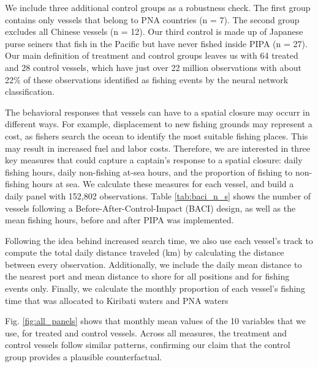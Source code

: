 \documentclass[9p,twocolumn,twoside,lineno]{pnas-new}
\begin{document}
We include three additional control groups as a
robustness check. The first group contains only vessels that belong to PNA countries (n
= 7). The second group excludes all Chinese vessels (n = 12). Our third control
is made up of Japanese purse seiners that fish in the Pacific but have
never fished inside PIPA (n = 27). Our main definition of treatment and control
groups leaves us with 64 treated and 28 control vessels, which have just over 22 million
observations with about 22\% of these observations identified as fishing events by the neural network classification.

The behavioral responses that vessels can have to a spatial closure may occurr in different ways.
For example, displacement to new fishing grounds may represent a cost, as fishers search the ocean
to identify the most suitable fishing places. This may result in increased fuel and labor costs. Therefore,
we are interested in three key measures that could capture a captain's response to a spatial closure:
daily fishing hours, daily non-fishing at-sea hours, and the proportion of fishing to non-fishing hours at sea.
We calculate these measures for each vessel, and build a daily panel
with 152,802 observations. Table \ref{tab:baci_n_s} shows the number
of vessels following a Before-After-Control-Impact (BACI) design, as well as the mean fishing hours, before
and after PIPA was implemented.

Following the idea behind increased search time, we also use each vessel's track to compute
the total daily distance traveled (km) by calculating the distance between every observation.
Additionally, we include the daily mean distance to the nearest port and mean distance to shore
for all positions and for fishing events only. Finally, we calculate the monthly proportion of each vessel's
fishing time that was allocated to Kiribati waters and PNA waters

Fig. \ref{fig:all_panels} shows that monthly mean values of the 10 variables that we use,
for treated and control vessels.  Across all measures, the treatment and control vessels follow similar patterns,
confirming our claim that the control group provides a plausible
counterfactual.


\end{document}
